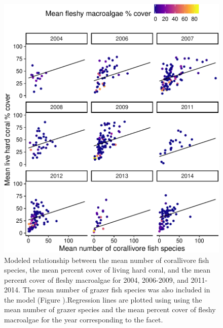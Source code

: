 \documentclass[12pt,]{article}
\begin{document}
\begin{figure}

{\centering \includegraphics{Mullaney_ENV872_Project_files/figure-latex/Coral Percent Cover Plot (Corallivores)-1} 

}

\caption{Modeled relationship between the mean number of corallivore fish species, the mean percent cover of living hard coral, and the mean percent cover of fleshy macroalgae for 2004, 2006-2009, and 2011-2014. The mean number of grazer fish species was also included in the model (Figure ).Regression lines are plotted using using the mean number of grazer species and the mean percent cover of fleshy macroalgae for the year corresponding to the facet.}\label{fig:Coral Percent Cover Plot (Corallivores)}
\end{figure}
\end{document}
